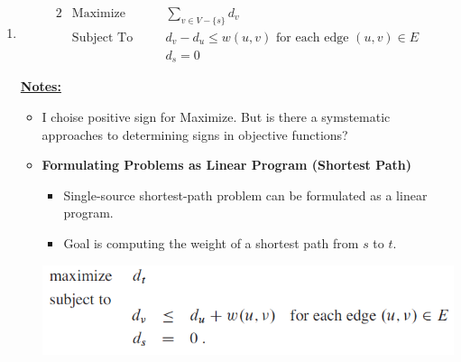 \documentclass[12pt]{article}
\begin{document}
\begin{enumerate}[1.]
    \item

    \bigskip

    \begin{alignat*}{2}
        & \text{Maximize}   & \quad & \sum\limits_{v \in V - \{s\}} d_v           \\
        & \text{Subject To} &       & d_v - d_u \leq w(u,v) \text{ for each edge $(u,v) \in E$}\\
        &                   &       & d_s = 0
    \end{alignat*}




    \underline{\textbf{Notes:}}

    \bigskip

    \begin{itemize}
        \item I choise positive sign for Maximize. But is there a symstematic approaches to
        determining signs in objective functions?
        \item \textbf{Formulating Problems as Linear Program (Shortest Path)}

        \begin{itemize}
            \item Single-source shortest-path problem can be formulated as a linear program.
            \item Goal is computing the weight of a shortest path from $s$ to $t$.
        \end{itemize}

        \bigskip

        \begin{center}
        \includegraphics[width=0.7\linewidth]{images/worksheet_6_solution_16.png}
        \end{center}


\end{itemize}
\end{enumerate}
\end{document}
